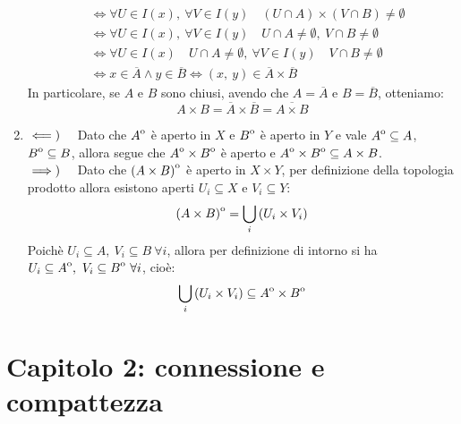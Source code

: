 \begin{demonstration}
\begin{enumerate}[label=\Roman*]
\begin{align*}
			&\iff \forall U\in I\left(x\right),\ \forall V\in I\left(y\right)\quad \left(U\cap A\right)\times\left(V\cap B\right)\neq \emptyset\\
			&\iff \forall U\in I\left(x\right),\ \forall V\in I\left(y\right)\quad U\cap A\neq \emptyset ,\ V\cap B\neq \emptyset\\
			&\iff \forall U\in I\left(x\right)\quad U\cap A\neq \emptyset ,\ \forall V\in I\left(y\right)\quad V\cap B\neq \emptyset\\
			&\iff x\in\overline{A}\wedge y\in \overline{B}\iff\left(x,\ y\right)\in\overline{A}\times \overline{B}
		\end{align*}
		In particolare, se $A$ e $B$ sono chiusi, avendo che $A=\overline{A}$ e $B=\overline{B}$, otteniamo:
		\begin{equation*}
			A\times B=\overline{A}\times \overline{B}=\overline{A\times B}
		\end{equation*}
	\item$\impliedby)\quad$ Dato che ${\kern0ptA}^{\mathrm{o}}$ è aperto in $X$ e ${\kern0ptB}^{\mathrm{o}}$ è aperto in $Y$ e vale ${\kern0ptA}^{\mathrm{o}}\subseteq A$, ${\kern0ptB}^{\mathrm{o}}\subseteq{B}$, allora segue che ${\kern0ptA}^{\mathrm{o}}\times{\kern0ptB}^{\mathrm{o}}$ è aperto e ${\kern0ptA}^{\mathrm{o}}\times{\kern0ptB}^{\mathrm{o}}\subseteq A\times B$.\\
	$\implies)\quad$ Dato che ${\kern0pt\left(A\times B\right)}^{\mathrm{o}}$ è aperto in $X\times Y$, per definizione della topologia prodotto allora esistono aperti $U_i\subseteq X$ e $V_i\subseteq Y$:
	\begin{equation*}
		{\kern0pt\left(A\times B\right)}^{\mathrm{o}}=\bigcup_i\left(U_i\times V_i\right)
	\end{equation*}
	Poichè $U_i\subseteq A,\ V_i\subseteq B\ \forall i$, allora per definizione di intorno si ha $U_i\subseteq\interior{A},\ V_i\subseteq\interior{B}\ \forall i$, cioè:
	\begin{equation*}
		\bigcup_i\left(U_i\times V_i\right)\subseteq {\kern0ptA}^{\mathrm{o}}\times {\kern0ptB}^{\mathrm{o}}
	\end{equation*}
	\end{enumerate}
	\vspace{-6mm}
\end{demonstration}
\section{Capitolo 2: connessione e compattezza}
